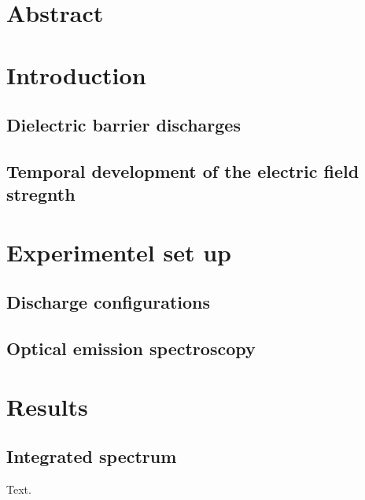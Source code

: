 \documentclass[a4paper,10pt]{article}
\begin{document}
		\vspace{1cm}
	
	\begin{multicols}{2}
		\tableofcontents
	\end{multicols}
	
		\vspace{1cm}
	
		\section{Abstract}
		
	\twocolumn

	\section{Introduction}
	
		\subsection{Dielectric barrier discharges}
		
		\subsection{Temporal development of the electric field stregnth}

	\section{Experimentel set up}
	
		\subsection{Discharge configurations}
		
		\subsection{Optical emission spectroscopy}

	\section{Results}

		\subsection{Integrated spectrum}
		
			Text.
		
\end{document}
